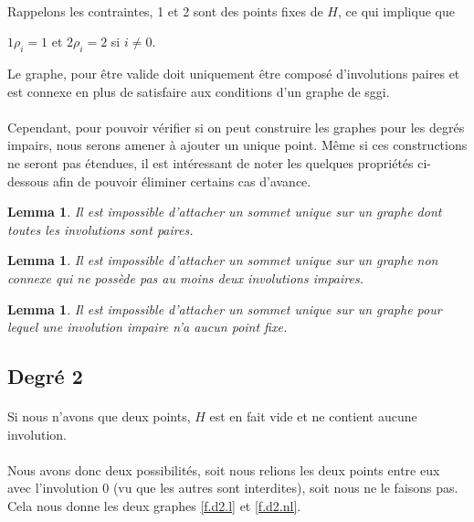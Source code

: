 \documentclass[a4paper]{article}
\theoremstyle{mytheorem}
\newtheorem{lemma}[definition]{Lemma}
\begin{document}
\paragraph{}
Rappelons les contraintes, 1 et 2 sont des points fixes de $H$, ce qui implique que
\begin{center}
  $1 \rho_i = 1$ et $2 \rho_i = 2$ si $i \neq 0$.
\end{center}
Le graphe, pour être valide doit uniquement être composé d'involutions paires et est connexe en plus de satisfaire aux conditions d'un graphe de sggi.

\paragraph{}
Cependant, pour pouvoir vérifier si on peut construire les graphes pour les degrés impairs, nous serons amener à ajouter un unique point. Même si ces constructions ne seront pas étendues, il est intéressant de noter les quelques propriétés ci-dessous afin de pouvoir éliminer certains cas d'avance.

\begin{lemma}\label{attachEven}
  Il est impossible d'attacher un sommet unique sur un graphe dont toutes les involutions sont paires.
\end{lemma}

\begin{lemma}\label{attachConnexEven}
  Il est impossible d'attacher un sommet unique sur un graphe non connexe qui ne possède pas au moins deux involutions impaires.
\end{lemma}

\begin{lemma}\label{attachNoFixedPoint}
  Il est impossible d'attacher un sommet unique sur un graphe pour lequel une involution impaire n'a aucun point fixe.
\end{lemma}

\subsection{Degré 2}

\paragraph{}
Si nous n'avons que deux points, $H$ est en fait vide et ne contient aucune involution.

\paragraph{}
Nous avons donc deux possibilités, soit nous relions les deux points entre eux avec l'involution 0 (vu que les autres sont interdites), soit nous ne le faisons pas. Cela nous donne les deux graphes \ref{f.d2.l} et \ref{f.d2.nl}.
\end{document}
